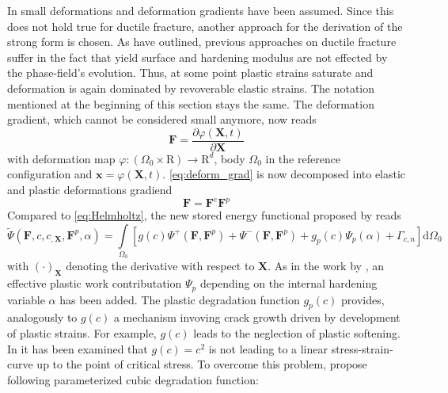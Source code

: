 In  small deformations and deformation gradients have been assumed. Since this does not hold true for ductile fracture, another approach for the derivation of the strong form is chosen. As \citet{03_PF_ductile} have outlined, previous approaches on ductile fracture suffer in the fact that yield surface and hardening modulus are not effected by the phase-field's evolution. Thus, at some point plastic strains saturate and deformation is again dominated by revoverable elastic strains. The notation mentioned at the beginning of this section stays the same. The deformation gradient, which cannot be considered small anymore, now reads
\begin{equation} \label{eq:deform_grad}
	\mathbf{F}=\dfrac{\partial\varphi\left(\mathbf{X},t\right)}{\partial\mathbf{X}}
\end{equation}
with deformation map $\varphi:\left(\Omega_{0}\times\mathrm{R}\right)\rightarrow\mathrm{R}^{d}$, body $\Omega_{0}$ in the reference configuration  and $\mathbf{x}=\varphi\left(\mathbf{X},t\right)$. \eqref{eq:deform_grad} is now decomposed into elastic and plastic deformations gradiend
\begin{equation} \label{eq:deform_grad_decomp}
	\mathbf{F}=\mathbf{F}^{e}\mathbf{F}^{p}
\end{equation}
Compared to \eqref{eq:Helmholtz}, the new stored energy functional proposed by \citet{03_PF_ductile} reads
\begin{equation} \label{eq:fctal_ductile}
	\tilde{\Psi}\left(\mathbf{F},c,c_{,\mathbf{X}},\mathbf{F}^{p},\alpha\right) = \int\limits_{\Omega_{0}}\left[g\left(c\right)\Psi^{+}\left(\mathbf{F},\mathbf{F}^{p}\right)+\Psi^{-}\left(\mathbf{F},\mathbf{F}^{p}\right)+g_{p}\left(c\right)\Psi_{p}\left(\alpha\right)+\Gamma_{c,n}\right]\mathrm{d}\Omega_{0}
\end{equation}
with $\left(\cdot\right)_{\mathbf{X}}$ denoting the derivative with respect to $\mathbf{X}$. As in the work by \citet{06_PF_ductile}, an effective plastic work contributation $\Psi_{p}$ depending on the internal hardening variable $\alpha$ has been added. The plastic degradation function $g_{p}\left(c\right)$ provides, analogously to $g\left(c\right)$ a mechanism invoving crack growth driven by development of plastic strains. For example, $g\left(c\right)$ leads to the neglection of plastic softening. In \citep{03_PF_ductile} it has been examined that $g\left(c\right)=c^{2}$ is not leading to a linear stress-strain-curve up to the point of critical stress. To overcome this problem, \citet{03_PF_ductile} propose following parameterized cubic degradation function:
